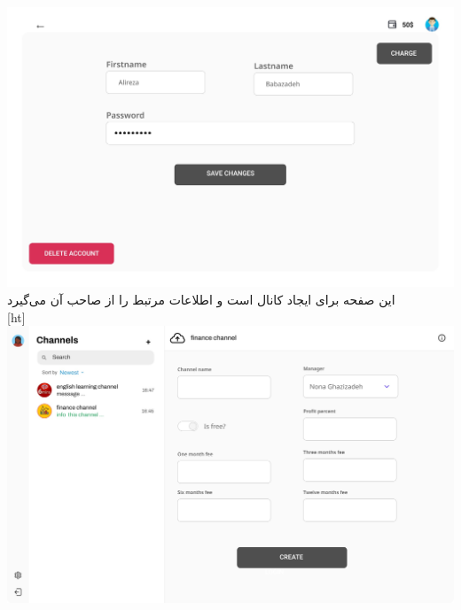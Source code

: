 \includegraphics[scale=0.2]{figs/user_page.jpeg}
‫
‫
‫
‫‫ \FloatBarrier
‫\clearpage
‫
‫
‫این صفحه برای ایجاد کانال است و اطلاعات مرتبط را از صاحب آن می‌گیرد 
‫\\
‫[ht]
\includegraphics[scale=0.2]{figs/add_channel.jpeg}
‫
‫
‫
